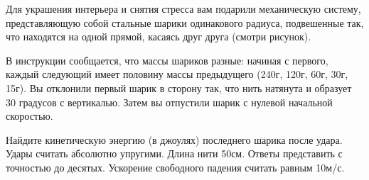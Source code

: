 
Для украшения интерьера и снятия стресса вам подарили механическую систему, 
представляющую собой стальные шарики одинакового радиуса, подвешенные так, что 
находятся на одной прямой, касаясь друг друга (смотри рисунок).


В инструкции сообщается, что массы шариков разные: начиная с первого, каждый следующий имеет 
половину массы предыдущего (240г, 120г, 60г, 30г, 15г). Вы отклонили первый шарик в сторону так, 
что нить натянута и образует 30 градусов с вертикалью. Затем вы отпустили шарик с 
нулевой начальной скоростью.

Найдите кинетическую энергию (в джоулях) последнего шарика после удара. Удары считать абсолютно упругими. Длина нити 50см. 
Ответы представить с точностью до десятых. Ускорение свободного падения считать равным 10м/с.

